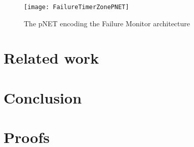 \documentclass{llncs}
\begin{document}
\begin{figure}[t]
  \centering
  \texttt{[image: FailureTimerZonePNET]}
  \caption{The pNET encoding the Failure Monitor architecture}
  \label{schema:ArchFailure:BIP}
\end{figure}



\section{Related work}
\label{secn:related}


\section{Conclusion}
\label{secn:conclusion}





\appendix
\clearpage

\section{Proofs}
\end{document}
